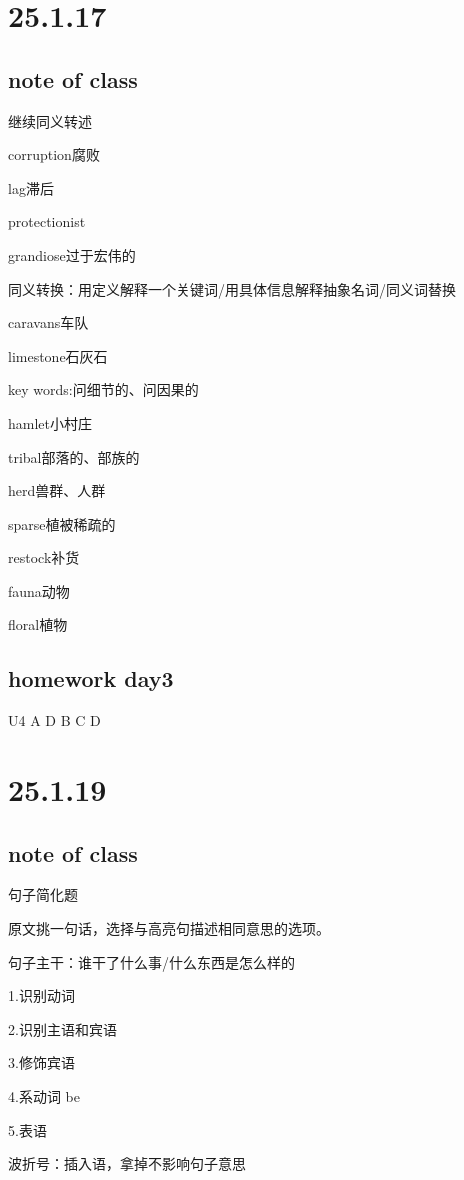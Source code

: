 \documentclass[a4paper, 10pt]{article}
\begin{document}
\section{25.1.17}
\subsection{note of class}

继续同义转述

corruption腐败

lag滞后

protectionist

grandiose过于宏伟的

同义转换：用定义解释一个关键词/用具体信息解释抽象名词/同义词替换

caravans车队

limestone石灰石

key words:问细节的、问因果的

hamlet小村庄

tribal部落的、部族的


herd兽群、人群

sparse植被稀疏的

restock补货

fauna动物

floral植物

\subsection{homework day3}

U4 A  D  B  C  D


\section{25.1.19}

\subsection{note of class}
句子简化题

原文挑一句话，选择与高亮句描述相同意思的选项。

句子主干：谁干了什么事/什么东西是怎么样的

1.识别动词

2.识别主语和宾语

3.修饰宾语

4.系动词 be

5.表语

波折号：插入语，拿掉不影响句子意思
\end{document}
